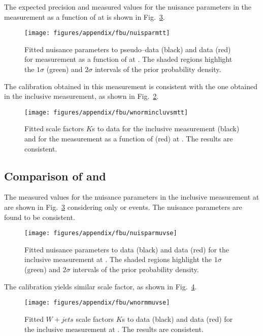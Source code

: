 The expected precision and measured values for the nuisance parameters
in the measurement as a function of \mtt{} at \eighttev{} is shown in
Fig.~\ref{fig:nuisparmtt}.
\begin{figure}[!htb]\centering
  \texttt{[image: figures/appendix/fbu/nuisparmtt]}
  \caption{Fitted nuisance parameters to pseudo--data (black) and data
    (red) for \ac{} measurement as a function of \mtt{} at \eighttev{}. The
    shaded regions highlight the $1\sigma$ (green) and $2\sigma$
    intervals of the prior probability density.}
  \label{fig:nuisparmtt}
\end{figure}
The \wjets{} calibration obtained in this measurement is consistent
with the one obtained in the inclusive measurement, as shown in
Fig.~\ref{fig:wnormincluvsmtt}. 
\begin{figure}[!htb]\centering
  \texttt{[image: figures/appendix/fbu/wnormincluvsmtt]}
  \caption{Fitted \wjets{} scale factors $K$s to data for the inclusive
    measurement (black) and for the measurement as a function of
    \mtt{} (red) at \eighttev{}. The results are consistent.}
  \label{fig:wnormincluvsmtt}
\end{figure}

\subsection{Comparison of \mujets{} and \ejets{}}

The measured values for the nuisance parameters
in the inclusive measurement at \eighttev{} are shown in
Fig.~\ref{fig:nuisparmtt} considering only \mujets{} or \ejets{}
events. The nuisance parameters are found to be consistent.
\begin{figure}[!htb]\centering
  \texttt{[image: figures/appendix/fbu/nuisparmuvse]}
  \caption{Fitted nuisance parameters to \mujets{} data (black) and
    \ejets{} data (red) for the inclusive \ac{} measurement at \eighttev{}. The
    shaded regions highlight the $1\sigma$ (green) and $2\sigma$
    intervals of the prior probability density.}
  \label{fig:nuisparmtt}
\end{figure}
The \wjets{} calibration yields similar scale factor, as shown in
Fig.~\ref{fig:wnormmuvse}.
\begin{figure}[!htb]\centering
  \texttt{[image: figures/appendix/fbu/wnormmuvse]}
  \caption{Fitted $W+jets$ scale factors $K$s to \mujets{} data (black)
    and \ejets{} data (red) for the inclusive
    measurement at \eighttev{}. The results are consistent.}
  \label{fig:wnormmuvse}
\end{figure}

